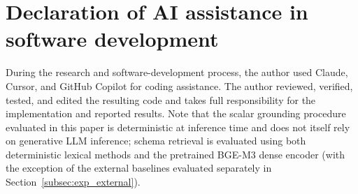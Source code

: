 \documentclass[3p]{elsarticle}
\begin{document}
\section*{Declaration of AI assistance in software development}

During the research and software-development process, the author used Claude, Cursor, and GitHub Copilot for coding assistance. The author reviewed, verified, tested, and edited the resulting code and takes full responsibility for the implementation and reported results. Note that the scalar grounding procedure evaluated in this paper is deterministic at inference time and does not itself rely on generative LLM inference; schema retrieval is evaluated using both deterministic lexical methods and the pretrained BGE-M3 dense encoder (with the exception of the external baselines evaluated separately in Section~\ref{subsec:exp_external}).



\end{document}
